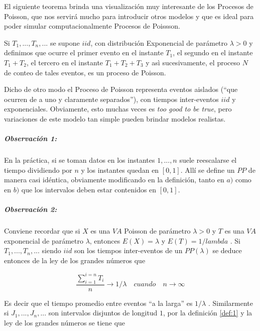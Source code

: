 \documentclass[
  oneside]{article}
\begin{document}
El siguiente teorema brinda una visualización muy interesante de los
Procesos de Poisson, que nos servirá mucho para introducir otros modelos
y que es ideal para poder simular computacionalmente Procesos de
Poissson.

\begin{theorem}\label{thm:otra_vision}
Si $T_1,...,T_n,...$ se supone $iid$,  con distribución Exponencial de parámetro $\lambda>0$ y definimos que ocurre el primer evento en el instante $T_1$, el segundo en el instante $T_1+T_2$, el tercero en el instante $T_1+T_2+T_3$ y asì sucesivamente, el proceso $N$ de conteo de tales eventos, es un proceso de Poisson.
\end{theorem}

Dicho de otro modo el Proceso de Poisson representa eventos aislados
(``que ocurren de a uno y claramente separados''), con tiempos
inter-eventos \(iid\) y exponenciales. Obviamente, esto muchas veces es
\textit{too good to be true}, pero variaciones de este modelo tan simple
pueden brindar modelos realistas.

\hypertarget{observaciuxf3n-1}{%
\subparagraph{Observación 1:}\label{observaciuxf3n-1}}

En la práctica, si se toman datos en los instantes \(1,...,n\) suele
reescalarse el tiempo dividiendo por \(n\) y los instantes quedan en
\([0,1]\). Allí se define un \(PP\) de manera casi idéntica, obviamente
modificando en la definición, tanto en \(a)\) como en \(b)\) que los
intervalos deben estar contenidos en \([0,1]\).

\hypertarget{observaciuxf3n-2}{%
\subparagraph{Observación 2:}\label{observaciuxf3n-2}}

Conviene recordar que si \(X\) es una \(VA\) Poisson de parámetro
\(\lambda>0\) y \(T\) es una \(VA\) exponencial de parámetro
\(\lambda\), entonces \(E(X)= \lambda\) y \(E(T)=1/lambda\) . Si
\(T_1,...,T_n,...\) siendo \(iid\) son los tiempos inter-eventos de un
\(PP(\lambda)\) se deduce entonces de la ley de los grandes números que

\begin{equation}
\frac{\sum_{i=1}^{i=n} T_i}{n} \rightarrow 1/ \lambda \quad cuando \quad n\rightarrow \infty
\end{equation}

Es decir que el tiempo promedio entre eventos ``a la larga'' es
\(1/\lambda\) . Similarmente si \(J_1,...,J_n,...\) son intervalos
disjuntos de longitud \(1\), por la definición \ref{def:1} y la ley de
los grandes números se tiene que
\end{document}
